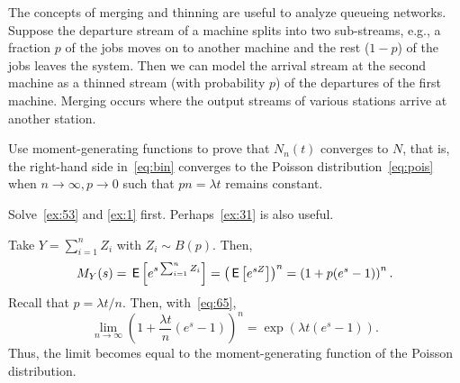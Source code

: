 The concepts of merging and thinning are useful to analyze queueing networks.
Suppose the departure stream of a machine splits into two sub-streams, e.g., a fraction $p$ of the jobs moves on to another machine and the rest ($1-p$) of the jobs leaves the system.
Then we can model the arrival stream at the second machine as a thinned stream (with probability $p$) of the departures of the first machine.
Merging occurs where the output streams of various stations arrive at another station.

\begin{exercise} 
 Use moment-generating functions to prove that $N_n(t)$ converges to $N$, that is, the right-hand side in~\cref{eq:bin} converges to the Poisson distribution~\cref{eq:pois} when $n\to \infty, p\to 0$ such that $p n=\lambda t$ remains constant.
\begin{hint}
Solve~\cref{ex:53} and \cref{ex:1} first. Perhaps~\cref{ex:31} is also useful.
\end{hint}
\begin{solution}
Take $Y=\sum_{i=1}^n Z_i$ with $Z_i\sim B(p)$. Then, 
\begin{equation*}
M_Y(s) = \,\mathsf{E}\left[e^{s\sum_{i=1}^n Z_i}\right] = \left(\,\mathsf{E}\left[e^{s Z}\right]\right)^n = \left(1 + p (e^s - 1)\right)^n. 
\end{equation*}
Recall that $p= \lambda t/ n$. Then, with~\cref{eq:65},
\begin{equation*}
\lim_{n\to\infty} \left(1 + \frac{\lambda t}{n} (e^s - 1)\right)^n = \exp({\lambda t (e^s-1)}). 
\end{equation*}
Thus, the limit becomes equal to the moment-generating function of the Poisson distribution. 
\end{solution}

\end{exercise}





